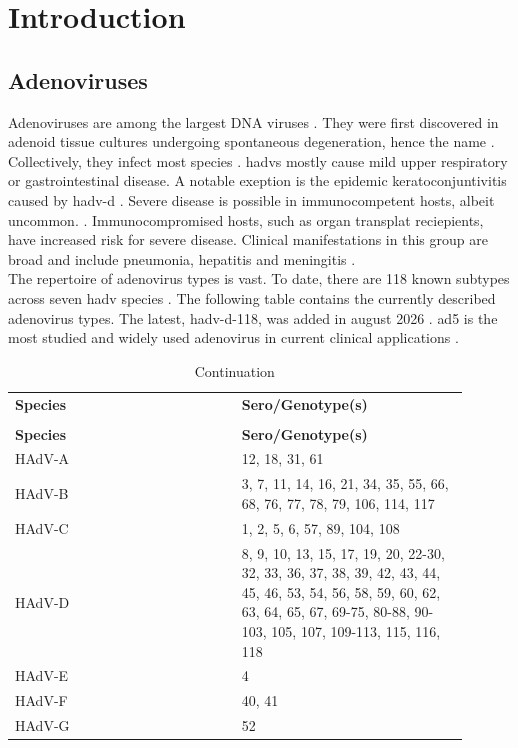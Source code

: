 \chapter{Introduction}
\setlength{\emergencystretch}{2em}

\section{Adenoviruses}
Adenoviruses are among the largest DNA viruses \cite{heimAdenoviren2016a}. They were first discovered in adenoid tissue cultures undergoing spontaneous degeneration, hence the name \cite{roweIsolationCytopathogenicAgent1953}. Collectively, they infect most species \cite{harrachAdenovirusesAnimalKingdom2019}. \acp{hadv} mostly cause mild upper respiratory or gastrointestinal disease. A notable exeption is the epidemic keratoconjuntivitis caused by \ac{hadv-d} \cite{pettitChronicKeratoconjunctivitisAssociated1979}. Severe disease is possible in immunocompetent hosts, albeit uncommon. \cite{parkThinsectionComputedTomography2017}. Immunocompromised hosts, such as organ transplat reciepients, have increased risk for severe disease. Clinical manifestations in this group are broad and include pneumonia, hepatitis and meningitis \cite{ljungmanRespiratoryVirusInfection1989}. 
\\ 
The repertoire of adenovirus types is vast. To date, there are 118 known subtypes across seven \acs{hadv} species \cite{dadkhahEvolutionHumanAdenoviruses2026}. The following table contains the currently described adenovirus types. The latest, \acs{hadv-d}-118, was added in august 2026 \cite{HAdVWorkingGroupb}. \ac{ad5} is the most studied and widely used adenovirus in current clinical applications \cite{salauddinClinicalApplicationAdenovirus2024}.

\newpage

\begin{longtable}{L{0.45\linewidth} R{0.45\linewidth}}
\caption{Adenovirus Types}
\label{tab:hadv-types}
\\
\toprule
{}
\textbf{Species}& \textbf{Sero/Genotype(s)}\\
\midrule                     
\endfirsthead
{}
\caption[]{Continuation}
\\
\toprule
{}
\textbf{Species}& \textbf{Sero/Genotype(s)}\\ 
\midrule
\endhead
\midrule
\endfoot
\bottomrule
\endlastfoot
HAdV-A & 12, 18, 31, 61\\ 
HAdV-B & 3, 7, 11, 14, 16, 21, 34, 35, 55, 66, 68, 76, 77, 78, 79, 106, 114, 117\\
HAdV-C & 1, 2, 5, 6, 57, 89, 104, 108\\
HAdV-D & 8, 9, 10, 13, 15, 17, 19, 20, 22-30, 32, 33, 36, 37, 38, 39, 42, 43, 44, 45, 46, 53, 54, 56, 58, 59, 60, 62, 63, 64, 65, 67, 69-75, 80-88, 90-103, 105, 107, 109-113, 115, 116, 118\\
HAdV-E & 4\\
HAdV-F & 40, 41\\
HAdV-G & 52\\
\end{longtable}


